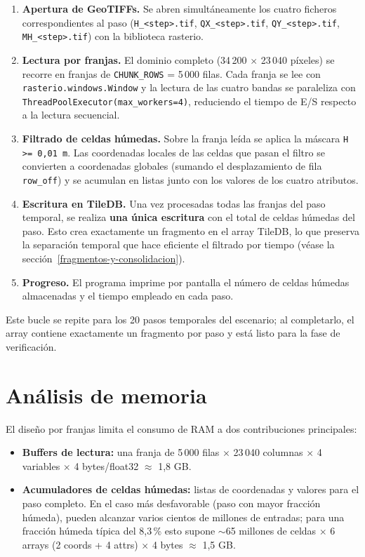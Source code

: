 \begin{enumerate}
\item \textbf{Apertura de GeoTIFFs.} Se abren simultáneamente los cuatro ficheros correspondientes al paso (\texttt{H\_<step>.tif}, \texttt{QX\_<step>.tif}, \texttt{QY\_<step>.tif}, \texttt{MH\_<step>.tif}) con la biblioteca rasterio.

\item \textbf{Lectura por franjas.} El dominio completo (34\,200 $\times$ 23\,040 píxeles) se recorre en franjas de \texttt{CHUNK\_ROWS} = 5\,000 filas. Cada franja se lee con \texttt{rasterio.windows.Window} y la lectura de las cuatro bandas se paraleliza con \texttt{ThreadPoolExecutor(max\_workers=4)}, reduciendo el tiempo de E/S respecto a la lectura secuencial.

\item \textbf{Filtrado de celdas húmedas.} Sobre la franja leída se aplica la máscara \texttt{H >= 0,01 m}. Las coordenadas locales de las celdas que pasan el filtro se convierten a coordenadas globales (sumando el desplazamiento de fila \texttt{row\_off}) y se acumulan en listas junto con los valores de los cuatro atributos.

\item \textbf{Escritura en TileDB.} Una vez procesadas todas las franjas del paso temporal, se realiza \textbf{una única escritura} con el total de celdas húmedas del paso. Esto crea exactamente un fragmento en el array TileDB, lo que preserva la separación temporal que hace eficiente el filtrado por tiempo (véase la sección~\ref{fragmentos-y-consolidacion}).

\item \textbf{Progreso.} El programa imprime por pantalla el número de celdas húmedas almacenadas y el tiempo empleado en cada paso.
\end{enumerate}

Este bucle se repite para los 20 pasos temporales del escenario; al completarlo, el array contiene exactamente un fragmento por paso y está listo para la fase de verificación.

\section{Análisis de memoria}\label{d.4-analisis-de-memoria}

El diseño por franjas limita el consumo de RAM a dos contribuciones principales:

\begin{itemize}
\item \textbf{Buffers de lectura:} una franja de 5\,000 filas $\times$ 23\,040 columnas $\times$ 4 variables $\times$ 4 bytes/float32 $\approx$ 1,8 GB.
\item \textbf{Acumuladores de celdas húmedas:} listas de coordenadas y valores para el paso completo. En el caso más desfavorable (paso con mayor fracción húmeda), pueden alcanzar varios cientos de millones de entradas; para una fracción húmeda típica del 8,3\,\% esto supone $\sim$65 millones de celdas $\times$ 6 arrays (2 coords + 4 attrs) $\times$ 4 bytes $\approx$ 1,5 GB.
\end{itemize}

